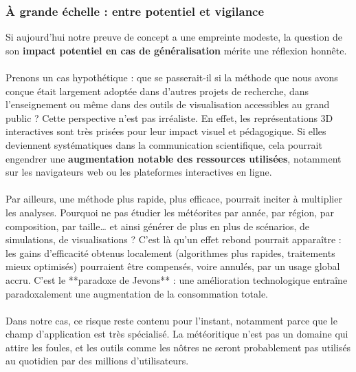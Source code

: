 \documentclass[12pt]{article}
\begin{document}
\subsubsection*{À grande échelle : entre potentiel et vigilance}

Si aujourd’hui notre preuve de concept a une empreinte modeste, la question de son \textbf{impact potentiel en cas de généralisation} mérite une réflexion honnête.\\
\\
Prenons un cas hypothétique : que se passerait-il si la méthode que nous avons conçue était largement adoptée dans d’autres projets de recherche, dans l’enseignement ou même dans des outils de visualisation accessibles au grand public ? Cette perspective n’est pas irréaliste. En effet, les représentations 3D interactives sont très prisées pour leur impact visuel et pédagogique. Si elles deviennent systématiques dans la communication scientifique, cela pourrait engendrer une \textbf{augmentation notable des ressources utilisées}, notamment sur les navigateurs web ou les plateformes interactives en ligne.\\
\\
Par ailleurs, une méthode plus rapide, plus efficace, pourrait inciter à multiplier les analyses. Pourquoi ne pas étudier les météorites par année, par région, par composition, par taille… et ainsi générer de plus en plus de scénarios, de simulations, de visualisations ? C’est là qu’un effet rebond pourrait apparaître : les gains d’efficacité obtenus localement (algorithmes plus rapides, traitements mieux optimisés) pourraient être compensés, voire annulés, par un usage global accru. C’est le **paradoxe de Jevons** : une amélioration technologique entraîne paradoxalement une augmentation de la consommation totale.\\
\\
Dans notre cas, ce risque reste contenu pour l’instant, notamment parce que le champ d’application est très spécialisé. La météoritique n’est pas un domaine qui attire les foules, et les outils comme les nôtres ne seront probablement pas utilisés au quotidien par des millions d’utilisateurs.
 
\end{document}
